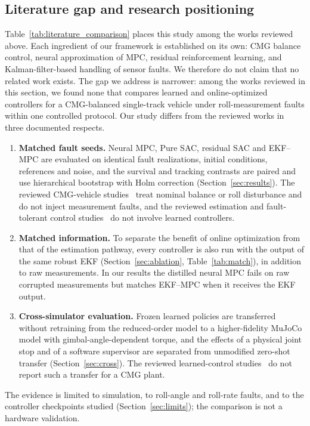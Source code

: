 \documentclass[preprint,12pt,authoryear=false]{elsarticle}
\theoremstyle{remark}\newtheorem{remark}{Remark}
\theoremstyle{plain}\newtheorem{proposition}{Proposition}\newtheorem{lemma}{Lemma}
\theoremstyle{definition}\newtheorem{assumption}{Assumption}
\begin{document}
\subsection{Literature gap and research positioning}
Table~\ref{tab:literature_comparison} places this study among the works reviewed above. Each ingredient of our framework is established on its own: CMG balance control, neural approximation of MPC, residual reinforcement learning, and Kalman-filter-based handling of sensor faults. We therefore do not claim that no related work exists. The gap we address is narrower: among the works reviewed in this section, we found none that compares learned and online-optimized controllers for a CMG-balanced single-track vehicle under roll-measurement faults within one controlled protocol. Our study differs from the reviewed works in three documented respects.
\begin{enumerate}
\item[(i)] \textbf{Matched fault seeds.} Neural MPC, Pure SAC, residual SAC and EKF--MPC are evaluated on identical fault realizations, initial conditions, references and noise, and the survival and tracking contrasts are paired and use hierarchical bootstrap with Holm correction (Section~\ref{sec:results}). The reviewed CMG-vehicle studies~\cite{beznos1998control,yetkin2014gyro,tofigh2021fractional,zheng2022dynamic} treat nominal balance or roll disturbance and do not inject measurement faults, and the reviewed estimation and fault-tolerant control studies~\cite{fang2022robust,pazera2018robust,zarringhalam2013optimal} do not involve learned controllers.
\item[(ii)] \textbf{Matched information.} To separate the benefit of online optimization from that of the estimation pathway, every controller is also run with the output of the same robust EKF (Section~\ref{sec:ablation}, Table~\ref{tab:match}), in addition to raw measurements. In our results the distilled neural MPC fails on raw corrupted measurements but matches EKF--MPC when it receives the EKF output.
\item[(iii)] \textbf{Cross-simulator evaluation.} Frozen learned policies are transferred without retraining from the reduced-order model to a higher-fidelity MuJoCo model with gimbal-angle-dependent torque, and the effects of a physical joint stop and of a software supervisor are separated from unmodified zero-shot transfer (Section~\ref{sec:cross}). The reviewed learned-control studies~\cite{hertneck2018learning,chen2022large,johannink2019residual} do not report such a transfer for a CMG plant.
\end{enumerate}
The evidence is limited to simulation, to roll-angle and roll-rate faults, and to the controller checkpoints studied (Section~\ref{sec:limits}); the comparison is not a hardware validation.
\end{document}
